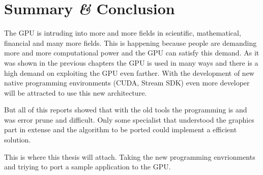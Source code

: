 \section{Summary {\textit{\&}} Conclusion} %
\label{sec:summary_conclusion}
The \gls{GPU} is intruding into more and more fields in scientific, mathematical, 
financial and many more fields. This is happening because people are demanding
more and more computational power and the \gls{GPU} can satisfy  this demand. 
As it was shown in the previous chapters the \gls{GPU} is used in many ways and
there is a high demand on exploiting the \gls{GPU} even farther. With the development
of new native programming environments (\gls{CUDA}, Stream \gls{SDK}) even more
developer will be attracted to use this new architecture. 

But all of this reports showed that with the old tools the programming is and was
error prune and difficult. Only some specialist that understood the graphics part
in extense and the algorithm to be ported could implement a efficient solution. 

This is where this thesis will attach. Taking the new programming envrionments
and triying to port a sample application to the \gls{GPU}. 










